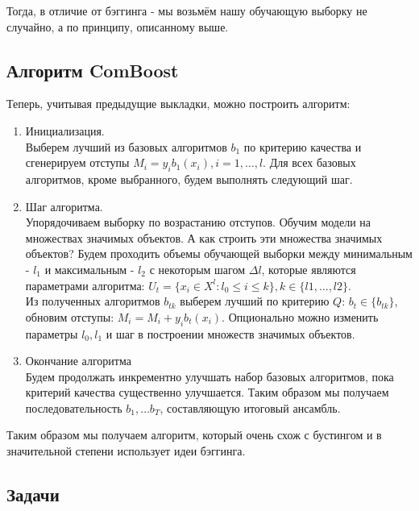 Тогда, в отличие от бэггинга - мы возьмём нашу обучающую выборку не случайно, а по принципу, описанному выше. \\
    
\subsection{Алгоритм ComBoost}

Теперь, учитывая предыдущие выкладки, можно построить алгоритм:
\begin{enumerate}
    \item Инициализация. \\
    Выберем лучший из базовых алгоритмов $b_1$ по критерию качества и сгенерируем отступы $M_i = y_ib_1(x_i), i=1,\dots,l$. Для всех базовых алгоритмов, кроме выбранного, будем выполнять следующий шаг.
    \item Шаг алгоритма. \\
    Упорядочиваем выборку по возрастанию отступов. Обучим модели на множествах значимых объектов. А как строить эти множества значимых объектов? Будем проходить объемы обучающей выборки между минимальным - $l_1$ и максимальным - $l_2$ с некоторым шагом $\Delta l$, которые являются параметрами алгоритма: $U_t = \{x_i \in X^l : l_0 \leq i \leq k\}, k \in \{l1, \dots, l2\}$. \\
    Из полученных алгоритмов $b_{tk}$ выберем лучший по критерию $Q$: $b_t \in \{b_{tk}\}$, обновим отступы: $M_i = M_i + y_i b_t(x_i)$. Опционально можно изменить параметры $l_0, l_1$ и шаг в построении множеств значимых объектов.
    \item Окончание алгоритма \\
    Будем продолжать инкрементно улучшать набор базовых алгоритмов, пока критерий качества существенно улучшается.
    Таким образом мы получаем последовательность $b_1, \dots b_T$, составляющую итоговый ансамбль.
\end{enumerate}
    
Таким образом мы получаем алгоритм, который очень схож с бустингом и в значительной степени использует идеи бэггинга. \\
    
\subsection{Задачи}
    
